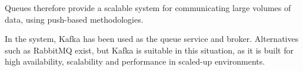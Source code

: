 Queues therefore provide a scalable system for communicating large volumes of data, using push-based methodologies.

In the system, Kafka has been used as the queue service and broker. Alternatives such as RabbitMQ exist, but Kafka is suitable in this situation, as it is built for high availability, scalability and performance in scaled-up environments.












